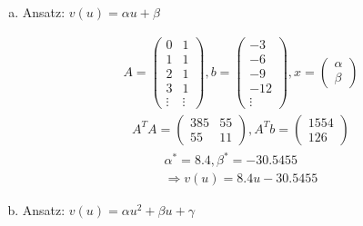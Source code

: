 \documentclass[11pt]{article} %
\begin{document}
\begin{enumerate}[a)]

\item Ansatz: $v(u) = \alpha u + \beta $

\begin{eqnarray*}
A = \begin{pmatrix} 0 & 1 \\ 1 & 1 \\ 2 & 1 \\ 3 & 1 \\ \vdots & \vdots \end{pmatrix},
b = \begin{pmatrix} -3 \\ -6 \\ -9 \\ -12 \\ \vdots \end{pmatrix}, x = \begin{pmatrix}\alpha \\ \beta\end{pmatrix}
\end{eqnarray*}
\begin{eqnarray*}
A^TA = \begin{pmatrix} 385 & 55 \\ 55 & 11 \end{pmatrix}, A^Tb = \begin{pmatrix}1554 \\ 126 \end{pmatrix}
\end{eqnarray*}
\begin{eqnarray*}
\alpha^* = 8.4, \beta^* = -30.5455  \\ \Rightarrow v(u) = 8.4u - 30.5455
\end{eqnarray*}

\item Ansatz: $v(u) = \alpha u^2 + \beta u + \gamma $


\end{enumerate}
\end{document}
